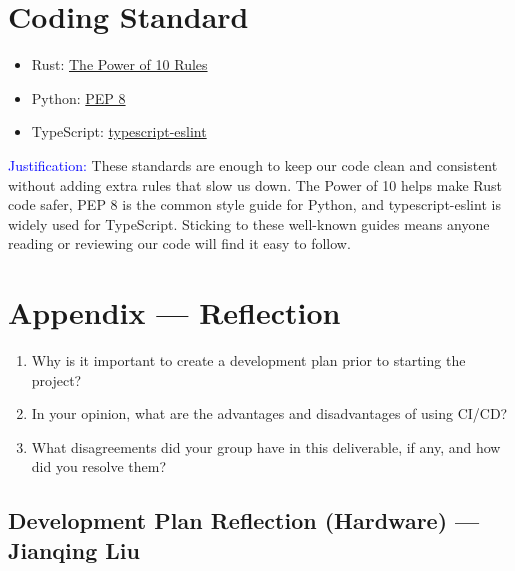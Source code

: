 \documentclass{article}
\begin{document}
\section{Coding Standard}

\begin{itemize}
  \item Rust:
        \href{https://en.wikipedia.org/wiki/The_Power_of_10:_Rules_for_Developing_Safety-Critical_Code}{The
          Power of 10 Rules}
  \item Python: \href{https://peps.python.org/pep-0008/}{PEP 8}
  \item TypeScript:
        \href{https://typescript-eslint.io/packages/typescript-eslint}{typescript-eslint}

\end{itemize}

\textcolor{blue}{Justification:} These standards are enough to keep our code clean
and consistent without adding extra rules that slow us down. The Power of 10 helps
make Rust code safer, PEP 8 is the common style guide for Python, and
typescript-eslint is widely used for TypeScript. Sticking to these well-known
guides means anyone reading or reviewing our code will find it easy to follow.


\newpage{}

\section*{Appendix --- Reflection}




\begin{enumerate}
  \item Why is it important to create a development plan prior to starting the project?
  \item In your opinion, what are the advantages and disadvantages of using CI/CD?
  \item What disagreements did your group have in this deliverable, if any, and how did
        you resolve them?
\end{enumerate}

\subsection*{Development Plan Reflection (Hardware) --- Jianqing Liu}
\end{document}
